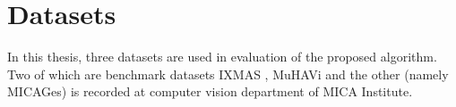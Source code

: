 
\section{Datasets} \label{sec:datasets}

    In this thesis, three datasets are used in evaluation of the proposed algorithm. Two of which are benchmark datasets IXMAS \cite{weinland2006free}, MuHAVi \cite{murtaza2016multi} and the other (namely MICAGes) is recorded at computer vision department of MICA Institute. 

    
    
    
